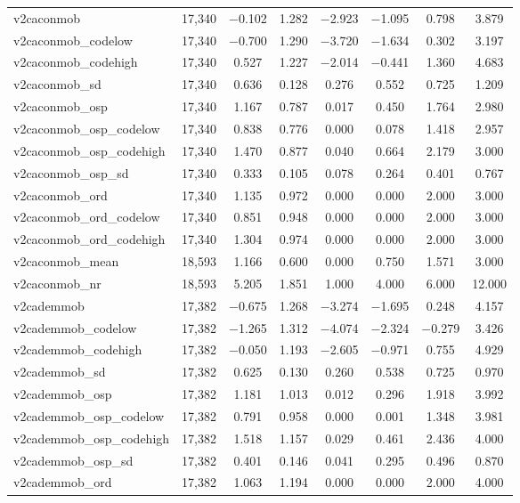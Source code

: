 \begin{table}[!htbp]
\begin{tabular}{@{\extracolsep{5pt}}lccccccc}
v2caconmob & 17,340 & $-$0.102 & 1.282 & $-$2.923 & $-$1.095 & 0.798 & 3.879 \\ 
v2caconmob\_codelow & 17,340 & $-$0.700 & 1.290 & $-$3.720 & $-$1.634 & 0.302 & 3.197 \\ 
v2caconmob\_codehigh & 17,340 & 0.527 & 1.227 & $-$2.014 & $-$0.441 & 1.360 & 4.683 \\ 
v2caconmob\_sd & 17,340 & 0.636 & 0.128 & 0.276 & 0.552 & 0.725 & 1.209 \\ 
v2caconmob\_osp & 17,340 & 1.167 & 0.787 & 0.017 & 0.450 & 1.764 & 2.980 \\ 
v2caconmob\_osp\_codelow & 17,340 & 0.838 & 0.776 & 0.000 & 0.078 & 1.418 & 2.957 \\ 
v2caconmob\_osp\_codehigh & 17,340 & 1.470 & 0.877 & 0.040 & 0.664 & 2.179 & 3.000 \\ 
v2caconmob\_osp\_sd & 17,340 & 0.333 & 0.105 & 0.078 & 0.264 & 0.401 & 0.767 \\ 
v2caconmob\_ord & 17,340 & 1.135 & 0.972 & 0.000 & 0.000 & 2.000 & 3.000 \\ 
v2caconmob\_ord\_codelow & 17,340 & 0.851 & 0.948 & 0.000 & 0.000 & 2.000 & 3.000 \\ 
v2caconmob\_ord\_codehigh & 17,340 & 1.304 & 0.974 & 0.000 & 0.000 & 2.000 & 3.000 \\ 
v2caconmob\_mean & 18,593 & 1.166 & 0.600 & 0.000 & 0.750 & 1.571 & 3.000 \\ 
v2caconmob\_nr & 18,593 & 5.205 & 1.851 & 1.000 & 4.000 & 6.000 & 12.000 \\ 
v2cademmob & 17,382 & $-$0.675 & 1.268 & $-$3.274 & $-$1.695 & 0.248 & 4.157 \\ 
v2cademmob\_codelow & 17,382 & $-$1.265 & 1.312 & $-$4.074 & $-$2.324 & $-$0.279 & 3.426 \\ 
v2cademmob\_codehigh & 17,382 & $-$0.050 & 1.193 & $-$2.605 & $-$0.971 & 0.755 & 4.929 \\ 
v2cademmob\_sd & 17,382 & 0.625 & 0.130 & 0.260 & 0.538 & 0.725 & 0.970 \\ 
v2cademmob\_osp & 17,382 & 1.181 & 1.013 & 0.012 & 0.296 & 1.918 & 3.992 \\ 
v2cademmob\_osp\_codelow & 17,382 & 0.791 & 0.958 & 0.000 & 0.001 & 1.348 & 3.981 \\ 
v2cademmob\_osp\_codehigh & 17,382 & 1.518 & 1.157 & 0.029 & 0.461 & 2.436 & 4.000 \\ 
v2cademmob\_osp\_sd & 17,382 & 0.401 & 0.146 & 0.041 & 0.295 & 0.496 & 0.870 \\ 
v2cademmob\_ord & 17,382 & 1.063 & 1.194 & 0.000 & 0.000 & 2.000 & 4.000 \\ 

\end{tabular}
\end{table}
